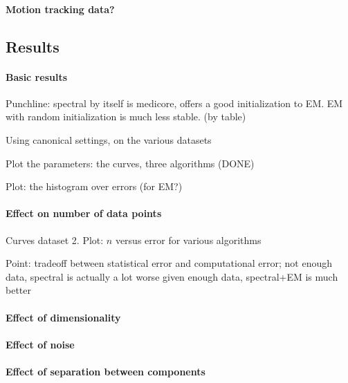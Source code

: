 \paragraph{Motion tracking data?}

\subsection{Results}

\paragraph{Basic results}

Punchline: spectral by itself is medicore, offers a good initialization to EM.
EM with random initialization is much less stable. (by table)

Using canonical settings, on the various datasets

Plot the parameters: the curves, three algorithms (DONE)

Plot: the histogram over errors (for EM?)

\paragraph{Effect on number of data points}

Curves dataset 2.
Plot: $n$ versus error for various algorithms

Point: tradeoff between statistical error and computational error;
not enough data, spectral is actually a lot worse
given enough data, spectral+EM is much better

\paragraph{Effect of dimensionality}

\paragraph{Effect of noise}

\paragraph{Effect of separation between components}
